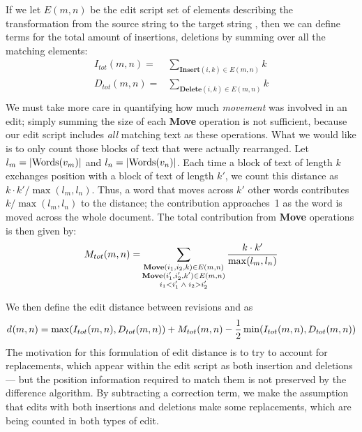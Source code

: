 If we let $E(m,n)$ be the edit script set of elements describing the
transformation from the source string 
to the target string ,
then we can define terms for the total amount of insertions,
deletions by summing over all the matching elements:
\begin{align*}
  I_{tot}(m,n) =& \sum_{\mathbf{Insert}(i, k) \in E(m,n)} k \\
  D_{tot}(m,n) =& \sum_{\mathbf{Delete}(i, k) \in E(m,n)} k \\
\end{align*}
%
We must take more care in quantifying how much \textit{movement}
was involved in an edit; simply summing the size of each
\textbf{Move} operation is not sufficient, because our edit script
includes \textit{all} matching text as these operations.
What we would like is to only count those blocks of text that
were actually rearranged.
Let $l_m = | \mathrm{Words}(v_{m}) |$ and $l_n = | \mathrm{Words}(v_{n}) |$.
Each time a block of text of length $k$ exchanges position
with a block of text of length $k'$, we count this distance
as $k \cdot k' / \max(l_m, l_n)$.
Thus, a word that moves across $k'$ other words contributes
$k / \max(l_m, l_n)$ to the distance; the contribution
approaches~1 as the word is moved across the whole document.
The total contribution from \textbf{Move} operations is
then given by:
%
\begin{align*}
  M_{tot}(m,n) =& \sum_{\substack{
        \mathbf{Move}(i_1, i_2, k) \in E(m,n) \\
        \mathbf{Move}(i'_1, i'_2, k') \in E(m,n) \\
        i_1 < i'_1 \;\wedge\; i_2 > i'_2
        }} \frac{k \cdot k'}{\max(l_m, l_n)} \\
\end{align*}

We then define the edit distance between revisions
 and  as
\begin{equation}
    \dist{}{m,n} = \max(I_{tot}(m,n), D_{tot}(m,n))
        + M_{tot}(m,n)
        - \frac{1}{2}\min(I_{tot}(m,n), D_{tot}(m,n)) \\
\label{eq:dist}
\end{equation}
The motivation for this formulation of edit distance is
to try to account for replacements, which appear within
the edit script as both insertion and deletions --- but the
position information required to match them is not preserved
by the difference algorithm.
By subtracting a correction term, we make the assumption
that edits with both insertions and deletions make some
replacements, which are being counted in both types of edit.

